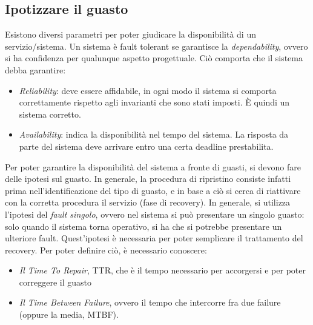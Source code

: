 \subsection{Ipotizzare il guasto}
Esistono diversi parametri per poter giudicare la disponibilità di un 
servizio/sistema.
Un sistema è fault tolerant se garantisce la \textit{dependability}, ovvero si 
ha confidenza per qualunque aspetto
progettuale. Ciò comporta che il sistema debba garantire:
\begin{itemize}
 \item \textit{Reliability}: deve essere affidabile, in ogni modo il sistema si 
comporta correttamente rispetto agli
invarianti che sono stati imposti. È quindi un sistema corretto.
 \item \textit{Availability}: indica la disponibilità nel tempo del sistema. La 
risposta da parte del sistema deve
arrivare entro una certa deadline prestabilita.
\end{itemize}
Per poter garantire la disponibilità del sistema a fronte di guasti, si devono 
fare delle ipotesi sul guasto. In
generale, la procedura di ripristino consiste infatti prima 
nell'identificazione del tipo di guasto, e in base a ciò si
cerca di riattivare con la corretta procedura il servizio (fase di recovery).
In generale, si utilizza l'ipotesi del \textit{fault singolo}, ovvero nel 
sistema si può presentare un singolo guasto:
solo quando il sistema torna operativo, si ha che si potrebbe presentare un 
ulteriore fault. Quest'ipotesi è necessaria
per poter semplicare il trattamento del recovery. Per poter definire ciò, è 
necessario conoscere:
\begin{itemize}
 \item \textit{Il Time To Repair}, TTR, che è il tempo necessario per 
accorgersi e per poter correggere il guasto
 \item \textit{Il Time Between Failure}, ovvero il tempo che intercorre fra due 
failure (oppure la media, MTBF).
\end{itemize}

